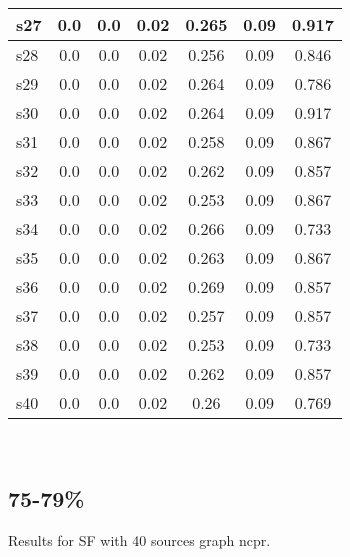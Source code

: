 \documentclass{article}
\begin{document}
\begin{tabular}{|l|c|c|c|c|c|c|}
\hline
s27 &0.0 & 0.0 & 0.02 & 0.265 & 0.09 & 0.917\\
\hline
s28 &0.0 & 0.0 & 0.02 & 0.256 & 0.09 & 0.846\\
\hline
s29 &0.0 & 0.0 & 0.02 & 0.264 & 0.09 & 0.786\\
\hline
s30 &0.0 & 0.0 & 0.02 & 0.264 & 0.09 & 0.917\\
\hline
s31 &0.0 & 0.0 & 0.02 & 0.258 & 0.09 & 0.867\\
\hline
s32 &0.0 & 0.0 & 0.02 & 0.262 & 0.09 & 0.857\\
\hline
s33 &0.0 & 0.0 & 0.02 & 0.253 & 0.09 & 0.867\\
\hline
s34 &0.0 & 0.0 & 0.02 & 0.266 & 0.09 & 0.733\\
\hline
s35 &0.0 & 0.0 & 0.02 & 0.263 & 0.09 & 0.867\\
\hline
s36 &0.0 & 0.0 & 0.02 & 0.269 & 0.09 & 0.857\\
\hline
s37 &0.0 & 0.0 & 0.02 & 0.257 & 0.09 & 0.857\\
\hline
s38 &0.0 & 0.0 & 0.02 & 0.253 & 0.09 & 0.733\\
\hline
s39 &0.0 & 0.0 & 0.02 & 0.262 & 0.09 & 0.857\\
\hline
s40 &0.0 & 0.0 & 0.02 & 0.26 & 0.09 & 0.769\\
\hline
\end{tabular}\\

\newpage

\subsection{75-79\%}

\noindent Results for SF with 40 sources graph ncpr.
\end{document}

